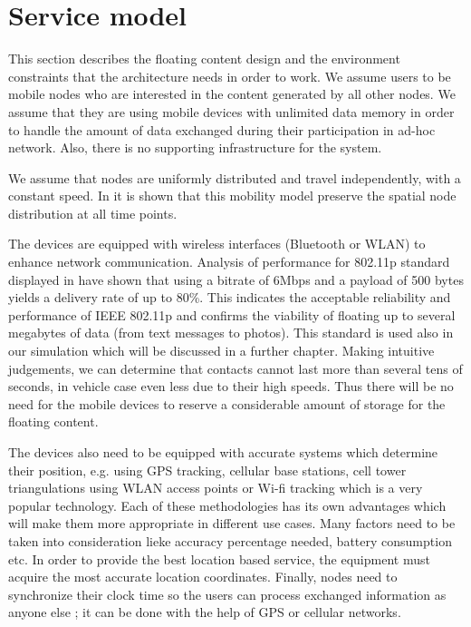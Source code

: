 \section{Service model}

This section describes the floating content design and the environment
constraints that the architecture needs in order to work. We assume users to be
mobile nodes who are interested in the content generated by all other nodes. We
assume that they are using mobile devices with unlimited data memory in order to
handle the amount of data exchanged during their participation in ad-hoc
network. Also, there is no supporting infrastructure for the system.

We assume that nodes are uniformly distributed and travel independently, with a
constant speed. In \cite{uniform_distribution} it is shown that this mobility
model preserve the spatial node distribution at all time points.

The devices are equipped with wireless interfaces (Bluetooth or WLAN) to enhance
network communication. Analysis of performance for 802.11p standard displayed in
\cite {performance80211} have shown that using a bitrate of 6Mbps and a
payload of 500 bytes yields a delivery rate of up to 80\%. This indicates the
acceptable reliability and performance of IEEE 802.11p and confirms the
viability of floating up to several megabytes of data (from text messages to
photos). This standard is used also in our simulation which will be discussed in
a further chapter. Making intuitive judgements, we can determine that contacts
cannot last more than several tens of seconds, in vehicle case even less due to
their high speeds. Thus there will be no need for the mobile devices to reserve
a considerable amount of storage for the floating content.

The devices also need to be equipped with accurate systems which determine their
position, e.g. using GPS tracking, cellular base stations, cell tower
triangulations using WLAN access points or Wi-fi tracking which is a very
popular technology. Each of these methodologies has its own advantages which
will make them more appropriate in different use cases. Many factors
need to be taken into consideration lieke accuracy percentage needed, battery
consumption etc. In order to provide the best location based service, the
equipment must acquire the most accurate location coordinates. Finally,
nodes need to synchronize their clock time so the users can process exchanged
information as anyone else ; it can be done with the help of GPS or cellular
networks.

